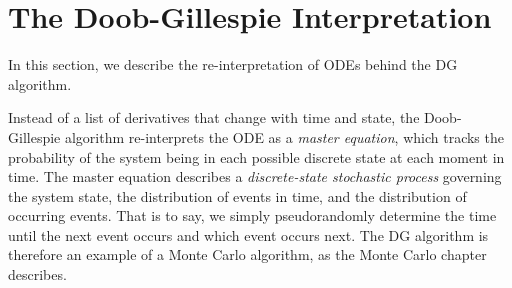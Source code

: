 \section{The Doob-Gillespie Interpretation}\label{sec:resolving}


In this section, we describe the re-interpretation of ODEs behind the DG algorithm.

Instead of a list of derivatives that change with time and state, the Doob-Gillespie algorithm \cite{doob1942topics,doob1945markoff,gillespie1976general,gillespie1977exact} re-interprets the ODE as a \textit{master equation}, which tracks the probability of the system being in each possible discrete state at each moment in time. The master equation describes a \textit{discrete-state stochastic process} governing the system state, the distribution of events in time, and the distribution of occurring events. That is to say, we simply pseudorandomly determine the time until the next event occurs and which event occurs next.   The DG algorithm is therefore an example of a Monte Carlo algorithm, as the Monte Carlo chapter describes.

